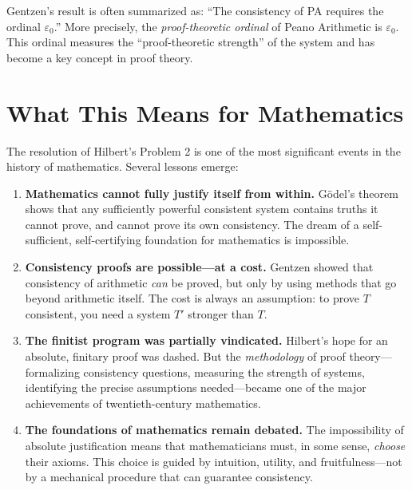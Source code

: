 \begin{remark}
Gentzen's result is often summarized as: ``The consistency of PA requires the ordinal $\varepsilon_0$.'' More precisely, the \emph{proof-theoretic ordinal} of Peano Arithmetic is $\varepsilon_0$. This ordinal measures the ``proof-theoretic strength'' of the system and has become a key concept in proof theory.
\end{remark}

\section{What This Means for Mathematics}

The resolution of Hilbert's Problem 2 is one of the most significant events in the history of mathematics. Several lessons emerge:

\begin{enumerate}
    \item \textbf{Mathematics cannot fully justify itself from within.} G\"odel's theorem shows that any sufficiently powerful consistent system contains truths it cannot prove, and cannot prove its own consistency. The dream of a self-sufficient, self-certifying foundation for mathematics is impossible.

    \item \textbf{Consistency proofs are possible---at a cost.} Gentzen showed that consistency of arithmetic \emph{can} be proved, but only by using methods that go beyond arithmetic itself. The cost is always an assumption: to prove $T$ consistent, you need a system $T'$ stronger than $T$.

    \item \textbf{The finitist program was partially vindicated.} Hilbert's hope for an absolute, finitary proof was dashed. But the \emph{methodology} of proof theory---formalizing consistency questions, measuring the strength of systems, identifying the precise assumptions needed---became one of the major achievements of twentieth-century mathematics.

    \item \textbf{The foundations of mathematics remain debated.} The impossibility of absolute justification means that mathematicians must, in some sense, \emph{choose} their axioms. This choice is guided by intuition, utility, and fruitfulness---not by a mechanical procedure that can guarantee consistency.
\end{enumerate}

